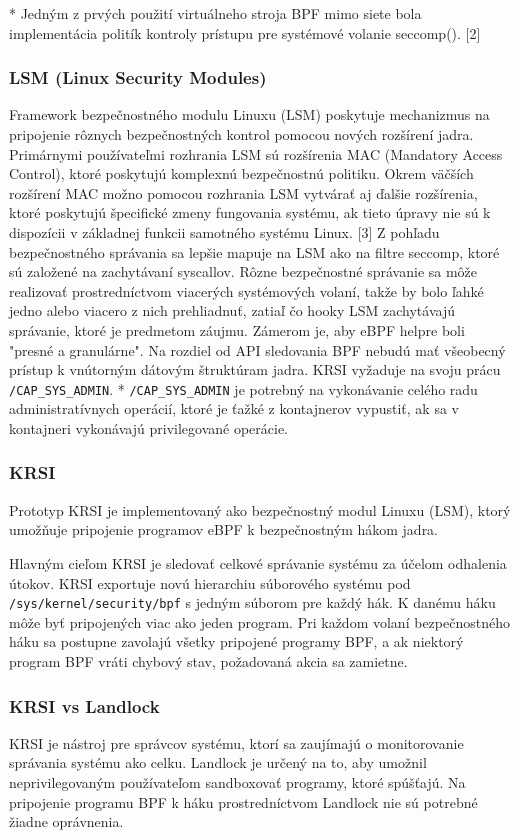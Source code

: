 * Jedným z prvých použití virtuálneho stroja BPF mimo siete bola implementácia politík kontroly prístupu pre systémové volanie seccomp(). [2]

\subsubsection{LSM (Linux Security Modules)}
Framework bezpečnostného modulu Linuxu (LSM) poskytuje mechanizmus na pripojenie rôznych bezpečnostných kontrol pomocou nových rozšírení jadra. Primárnymi používateľmi rozhrania LSM sú rozšírenia MAC (Mandatory Access Control), ktoré poskytujú komplexnú bezpečnostnú politiku. Okrem väčších rozšírení MAC možno pomocou rozhrania LSM vytvárať aj ďalšie rozšírenia, ktoré poskytujú špecifické zmeny fungovania systému, ak tieto úpravy nie sú k dispozícii v základnej funkcii samotného systému Linux. [3]
Z pohľadu bezpečnostného správania sa lepšie mapuje na LSM ako na filtre seccomp, ktoré sú založené na zachytávaní syscallov. Rôzne bezpečnostné správanie sa môže realizovať prostredníctvom viacerých systémových volaní, takže by bolo ľahké jedno alebo viacero z nich prehliadnuť, zatiaľ čo hooky LSM zachytávajú správanie, ktoré je predmetom záujmu. Zámerom je, aby eBPF helpre boli "presné a granulárne". Na rozdiel od API sledovania BPF nebudú mať všeobecný prístup k vnútorným dátovým štruktúram jadra. 
KRSI vyžaduje na svoju prácu \texttt{/CAP\_SYS\_ADMIN}.
* \texttt{/CAP\_SYS\_ADMIN} je potrebný na vykonávanie celého radu administratívnych operácií, ktoré je ťažké z kontajnerov vypustiť, ak sa v kontajneri vykonávajú privilegované operácie.

\subsubsection{KRSI}
Prototyp KRSI je implementovaný ako bezpečnostný modul Linuxu (LSM), ktorý umožňuje pripojenie programov eBPF k bezpečnostným hákom jadra.

Hlavným cieľom KRSI je sledovať celkové správanie systému za účelom odhalenia útokov. 
KRSI exportuje novú hierarchiu súborového systému pod \texttt{/sys/kernel/security/bpf} s jedným súborom pre každý hák.
K danému háku môže byť pripojených viac ako jeden program.
Pri každom volaní bezpečnostného háku sa postupne zavolajú všetky pripojené programy BPF, a ak niektorý program BPF vráti chybový stav, požadovaná akcia sa zamietne.

\subsubsection{KRSI vs Landlock} 
KRSI je nástroj pre správcov systému, ktorí sa zaujímajú o monitorovanie správania systému ako celku.
Landlock je určený na to, aby umožnil neprivilegovaným používateľom sandboxovať programy, ktoré spúšťajú.  
Na pripojenie programu BPF k háku prostredníctvom Landlock nie sú potrebné žiadne oprávnenia.

